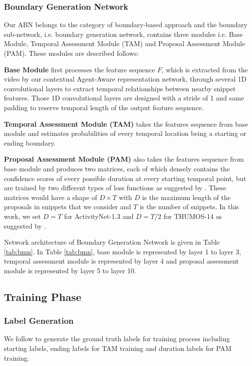 \documentclass{ieeeaccess}
\begin{document}
\subsubsection{Boundary Generation Network}
\label{subsec:BMN}

Our ABN belongs to the category of boundary-based approach and the boundary sub-network, i.e.  boundary generation network, contains three modules i.e. Base Module, Temporal Assessment Module (TAM) and Proposal Assessment Module (PAM). These modules are described follows:

\textbf{Base Module}
first processes the feature sequence $F$, which is extracted from the video by our contextual Agent-Aware representation network, through several 1D convolutional layers to extract temporal relationships between nearby snippet features. Those 1D convolutional layers are designed with a stride of 1 and same padding to reserve temporal length of the output feature sequence.

\textbf{Temporal Assessment Module (TAM)}
takes the features sequence from base module and estimates probabilities of every temporal location being a starting or ending boundary.

\textbf{Proposal Assessment Module (PAM)}
also takes the features sequence from base module and produces two matrices, each of which densely contains the confidence scores of every possible duration at every starting temporal point, but are trained by two different types of loss functions as suggested by \cite{bmn}. These matrices would have a shape of $D \times T$ with $D$ is the maximum length of the proposals in snippets that we consider and $T$ is the number of snippets. In this work, we set $D = T$ for ActivityNet-1.3 \cite{caba2015activitynet} and $D = T/2$ for THUMOS-14 \cite{THUMOS14} as suggested by \cite{bmn}.

Network architecture of Boundary Generation Network is given in Table \ref{tab:bmn}. In Table \ref{tab:bmn}, base module is represented by layer 1 to layer 3, temporal assessment module is represented by layer 4 and proposal assessment module is represented by layer 5 to layer 10.




\subsection{Training Phase}

\subsubsection{Label Generation}
We follow \cite{bmn, lin2018bsn} to generate the ground truth labels for training process including starting labels, ending labels for TAM training and duration labels for PAM training.
\end{document}
